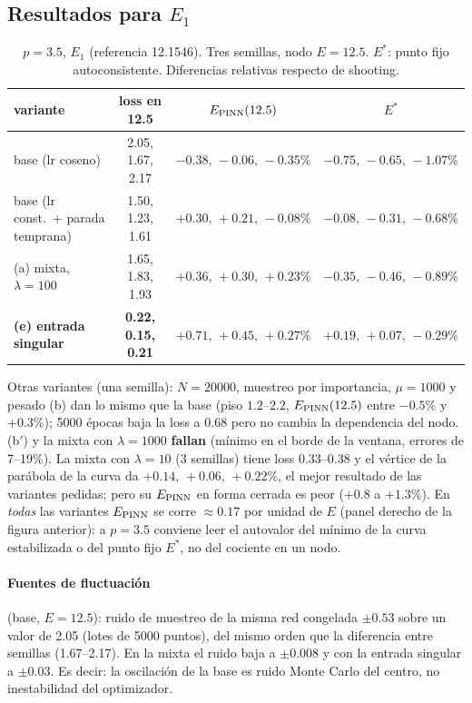 \documentclass[11pt,a4paper]{article}
\begin{document}
\subsection{Resultados para $E_1$}
\begin{table}[H]\centering
\caption{$p=3.5$, $E_1$ (referencia 12.1546). Tres semillas, nodo $E=12.5$. $E^*$: punto fijo autoconsistente.
Diferencias relativas respecto de shooting.}
\small
\begin{tabular}{lccc}
\toprule
variante & loss en 12.5 & $E_{\rm PINN}(12.5)$ & $E^*$\\
\midrule
base (lr coseno) & 2.05, 1.67, 2.17 & $-0.38,\,-0.06,\,-0.35\%$ & $-0.75,\,-0.65,\,-1.07\%$\\
base (lr const.\ + parada temprana) & 1.50, 1.23, 1.61 & $+0.30,\,+0.21,\,-0.08\%$ & $-0.08,\,-0.31,\,-0.68\%$\\
(a) mixta, $\lambda=100$ & 1.65, 1.83, 1.93 & $+0.36,\,+0.30,\,+0.23\%$ & $-0.35,\,-0.46,\,-0.89\%$\\
\textbf{(e) entrada singular} & \textbf{0.22, 0.15, 0.21} & $\mathbf{+0.71,\,+0.45,\,+0.27\%}$ & $\mathbf{+0.19,\,+0.07,\,-0.29\%}$\\
\bottomrule
\end{tabular}
\end{table}
Otras variantes (una semilla): $N=20000$, muestreo por importancia, $\mu=1000$ y pesado (b) dan lo mismo que la base
(piso $1.2$--$2.2$, $E_{\rm PINN}(12.5)$ entre $-0.5\%$ y $+0.3\%$); 5000 épocas baja la loss a $0.68$ pero no cambia la
dependencia del nodo. (b$'$) y la mixta con $\lambda=1000$ \textbf{fallan} (mínimo en el borde de la ventana,
errores de 7--19\%). La mixta con $\lambda=10$ (3 semillas) tiene loss $0.33$--$0.38$ y el vértice de la parábola de la curva
da $+0.14,\,+0.06,\,+0.22\%$, el mejor resultado de las variantes pedidas; pero su $E_{\rm PINN}$ en forma cerrada es
peor ($+0.8$ a $+1.3\%$). En \emph{todas} las variantes $E_{\rm PINN}$ se corre $\approx0.17$ por unidad de $E$ (panel
derecho de la figura anterior): a $p=3.5$ conviene leer el autovalor del mínimo de la curva estabilizada o del punto fijo
$E^*$, no del cociente en un nodo.

\paragraph{Fuentes de fluctuación} (base, $E=12.5$): ruido de muestreo de la misma red congelada
$\pm0.53$ sobre un valor de 2.05 (lotes de 5000 puntos), del mismo orden que la diferencia entre semillas (1.67--2.17).
En la mixta el ruido baja a $\pm0.008$ y con la entrada singular a $\pm0.03$. Es decir: la oscilación de la base es ruido
Monte Carlo del centro, no inestabilidad del optimizador.
\end{document}
